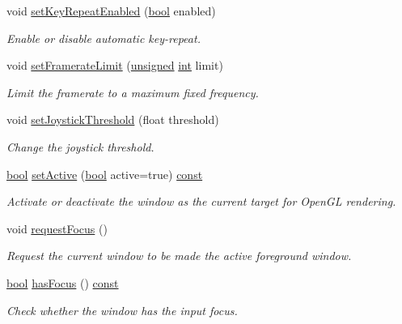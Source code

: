 \begin{DoxyCompactItemize}
void \hyperlink{classsf_1_1_window_aef9f2b14c10ecba8a8df95dd51c5bb73}{set\-Key\-Repeat\-Enabled} (\hyperlink{term__entry_8h_a002004ba5d663f149f6c38064926abac}{bool} enabled)
\begin{DoxyCompactList}\small\item\em Enable or disable automatic key-\/repeat. \end{DoxyCompactList}\item 
void \hyperlink{classsf_1_1_window_af4322d315baf93405bf0d5087ad5e784}{set\-Framerate\-Limit} (\hyperlink{curses_8priv_8h_aca40206900cfc164654362fa8d4ad1e6}{unsigned} \hyperlink{term__entry_8h_ad65b480f8c8270356b45a9890f6499ae}{int} limit)
\begin{DoxyCompactList}\small\item\em Limit the framerate to a maximum fixed frequency. \end{DoxyCompactList}\item 
void \hyperlink{classsf_1_1_window_aa45b8f54e29a6f59f1fc7ee66b2fab68}{set\-Joystick\-Threshold} (float threshold)
\begin{DoxyCompactList}\small\item\em Change the joystick threshold. \end{DoxyCompactList}\item 
\hyperlink{term__entry_8h_a002004ba5d663f149f6c38064926abac}{bool} \hyperlink{classsf_1_1_window_a17ccf8ece0ce0bf2f1e6698bcfa29731}{set\-Active} (\hyperlink{term__entry_8h_a002004ba5d663f149f6c38064926abac}{bool} active=true) \hyperlink{term__entry_8h_a57bd63ce7f9a353488880e3de6692d5a}{const} 
\begin{DoxyCompactList}\small\item\em Activate or deactivate the window as the current target for Open\-G\-L rendering. \end{DoxyCompactList}\item 
void \hyperlink{classsf_1_1_window_a58cf7fa1775e8e7542032e3ecfa83b49}{request\-Focus} ()
\begin{DoxyCompactList}\small\item\em Request the current window to be made the active foreground window. \end{DoxyCompactList}\item 
\hyperlink{term__entry_8h_a002004ba5d663f149f6c38064926abac}{bool} \hyperlink{classsf_1_1_window_ac4dce670f07c5039a732ba0903ce3a77}{has\-Focus} () \hyperlink{term__entry_8h_a57bd63ce7f9a353488880e3de6692d5a}{const} 
\begin{DoxyCompactList}\small\item\em Check whether the window has the input focus. \end{DoxyCompactList}\item 

\end{DoxyCompactItemize}
